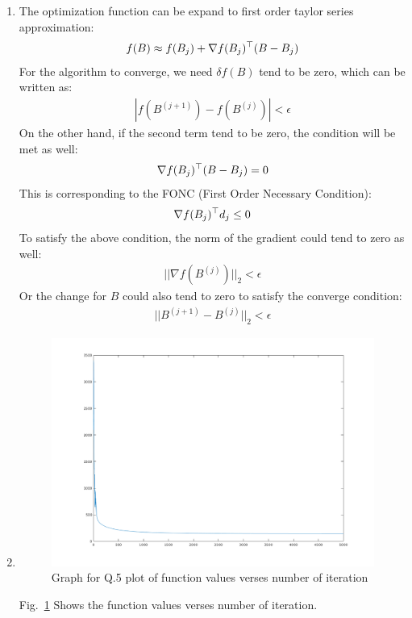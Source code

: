 \documentclass[12pt,twoside]{article}
\begin{document}
\begin{enumerate}[1)]
\item
The optimization function can be expand to first order taylor series approximation:
\begin{align}
f(B) \approx f(B_j) + \nabla f(B_j)^\top(B-B_j)
\end{align}
For the algorithm to converge, we need $\delta f(B)$ tend to be zero, which can be written as:
\begin{align}
|f(B^{(j+1)}) - f(B^{(j)})| < \epsilon
\end{align}
On the other hand, if the second term tend to be zero, the condition will be met as well:
\begin{align}
\nabla f(B_j)^\top(B-B_j) = 0
\end{align}
This is corresponding to the FONC (First Order Necessary Condition):
\begin{align}
\nabla f(B_j)^\top d_j \leq 0
\end{align}
To satisfy the above condition, the norm of the gradient could tend to zero as well:
\begin{align}
||\nabla f(B^{(j)})||_2 < \epsilon
\end{align}
Or the change for $B$ could also tend to zero to satisfy the converge condition:
\begin{align}
||B^{(j+1)} - B^{(j)}||_2 < \epsilon
\end{align}
\item
\begin{figure}[tb]
\centering
\includegraphics[width = 1.0\hsize]{./figures/p2q5}
\caption{Graph for Q.5 plot of function values verses number of iteration}
\label{fig:p2q5 fig}
\end{figure}
Fig.~\ref{fig:p2q5 fig} Shows the function values verses number of iteration.\\

\end{enumerate}
\end{document}
